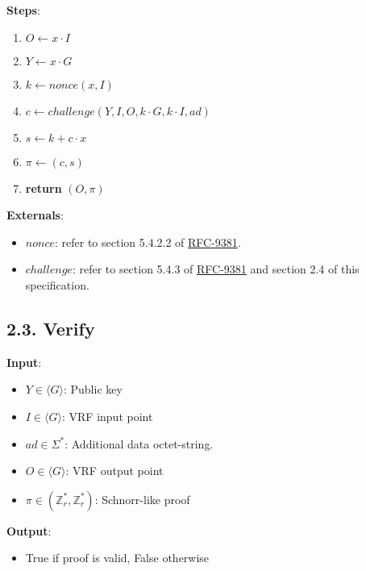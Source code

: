 \documentclass[
]{article}
\providecommand{\tightlist}{%
  \setlength{\itemsep}{0pt}\setlength{\parskip}{0pt}}
\begin{document}
\textbf{Steps}:

\begin{enumerate}
\def\labelenumi{\arabic{enumi}.}
\tightlist
\item
  \(O \leftarrow x \cdot I\)
\item
  \(Y \leftarrow x \cdot G\)
\item
  \(k \leftarrow nonce(x, I)\)
\item
  \(c \leftarrow challenge(Y, I, O, k \cdot G, k \cdot I, ad)\)
\item
  \(s \leftarrow k + c \cdot x\)
\item
  \(\pi \leftarrow (c, s)\)
\item
  \textbf{return} \((O, \pi)\)
\end{enumerate}

\textbf{Externals}:

\begin{itemize}
\tightlist
\item
  \(nonce\): refer to section 5.4.2.2 of
  \href{https://datatracker.ietf.org/doc/rfc9381}{RFC-9381}.
\item
  \(challenge\): refer to section 5.4.3 of
  \href{https://datatracker.ietf.org/doc/rfc9381}{RFC-9381} and section
  2.4 of this specification.
\end{itemize}

\hypertarget{verify}{%
\subsection{2.3. Verify}\label{verify}}

\textbf{Input}:

\begin{itemize}
\tightlist
\item
  \(Y \in \langle G \rangle\): Public key
\item
  \(I \in \langle G \rangle\): VRF input point
\item
  \(ad \in \Sigma^*\): Additional data octet-string.
\item
  \(O \in \langle G \rangle\): VRF output point
\item
  \(\pi \in (\mathbb{Z}^*_r, \mathbb{Z}^*_r)\): Schnorr-like proof
\end{itemize}

\textbf{Output}:

\begin{itemize}
\tightlist
\item
  True if proof is valid, False otherwise
\end{itemize}
\end{document}
